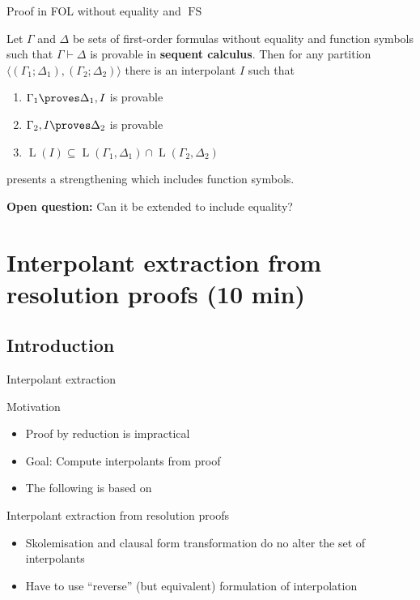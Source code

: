 \documentclass[final,compress]{beamer}
\DeclareMathOperator{\Lang}{L}
\begin{document}
\begin{frame}{Proof in FOL without equality and $\operatorname{FS}$}


	\begin{lemma}[Maehara]
		Let $\Gamma$ and $\Delta$ be sets of first-order formulas without equality and function symbols   such that $\Gamma \vdash \Delta$ is provable in \textbf{sequent calculus}.
		Then for any partition $\langle(\Gamma_1;\Delta_1),(\Gamma_2;\Delta_2)\rangle$
		there is an interpolant $I$ such that
		\begin{enumerate}
			\item $\Gamma_1 \proves \Delta_1, I$ is provable
			\item $\Gamma_2, I \proves \Delta_2$ is provable
			\item $\Lang(I) \subseteq \Lang(\Gamma_1, \Delta_1) \cap \Lang(\Gamma_2, \Delta_2)$
		\end{enumerate}
	\end{lemma}

	\pause
	\cite{baaz2011methods} presents a strengthening which includes function symbols.

	\textbf{Open question:} Can it be extended to include equality?
\end{frame}

\section{Interpolant extraction from resolution proofs (10 min)}

\subsection{Introduction}
\begin{frame}{Interpolant extraction}
	\begin{block}{Motivation}
		\begin{itemize}
			\item Proof by reduction is impractical
			\item Goal: Compute interpolants from proof
			\item The following is based on \cite{Huang95}
		\end{itemize}
	\end{block}
	\pause
	\begin{block}{Interpolant extraction from resolution proofs}
		\begin{itemize}
			\item Skolemisation and clausal form transformation do no alter the set of interpolants
			\item Have to use ``reverse'' (but equivalent) formulation of interpolation
		\end{itemize}
	\end{block}

\end{frame}
\end{document}
